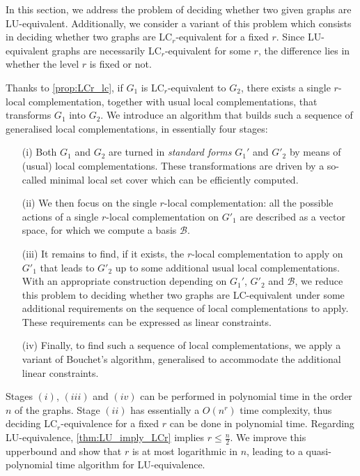 \documentclass[a4paper,UKenglish,cleveref,autoref,thm-restate]{arxiv}
\begin{document}
In this section, we address the problem of deciding whether two given graphs are LU-equivalent. Additionally, we  consider a variant of this problem which consists in deciding whether two graphs are LC$_r$-equivalent for a fixed $r$.  Since LU-equivalent graphs are necessarily LC$_r$-equivalent for some $r$, the difference lies in whether the level $r$ is fixed or not. 

Thanks to \cref{prop:LCr_lc}, if $G_1$ is  LC$_r$-equivalent to $G_2$, there exists a single $r$-local complementation, together with usual local complementations, that transforms $G_1$ into $G_2$. We introduce an algorithm that builds such a sequence of generalised local complementations, in essentially four stages: 
\begin{itemize}
\item[(i)] Both $G_1$ and $G_2$ are turned in \emph{standard forms} $G_1'$ and $G'_2$ by means of (usual) local complementations. These transformations are driven by a so-called  minimal local set cover which can be efficiently computed.  
\item[(ii)] We then focus on the single $r$-local complementation: all the possible actions of a single $r$-local complementation on $G'_1$ are described as a vector space, for which we compute a basis $\mathcal B$.  
\item[(iii)] It remains to find, if it exists, the $r$-local complementation to apply on $G'_1$ that leads to $G'_2$ up to some additional usual local complementations. With an appropriate construction depending on $G_1'$, $G'_2$ and $\mathcal B$, we reduce this problem to deciding whether two graphs are LC-equivalent under some additional requirements  on the sequence of local complementations to apply. These requirements can be expressed as linear constraints.
\item [(iv)] Finally, to find such a sequence of local complementations, we apply a variant of Bouchet's algorithm, generalised to accommodate the additional linear constraints. 
\end{itemize}

Stages $(i)$, $(iii)$ and $(iv)$ can be performed in polynomial time in the order $n$ of the graphs. Stage $(ii)$ has essentially a $O(n^r)$ time complexity, thus deciding LC$_r$-equivalence for a fixed $r$ can be done in polynomial time. Regarding LU-equivalence, \cref{thm:LU_imply_LCr} implies $r\le \frac n2$. We improve this upperbound and show that $r$ is at most logarithmic in $n$, leading to a quasi-polynomial time algorithm for LU-equivalence. 
\end{document}
